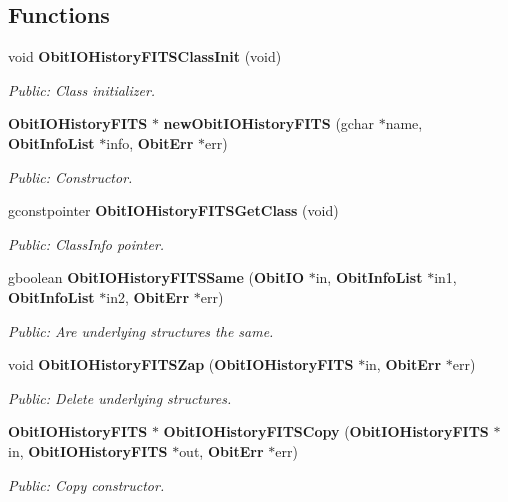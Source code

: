 \subsection*{Functions}
\begin{CompactItemize}
\item 
void {\bf Obit\-IOHistory\-FITSClass\-Init} (void)
\begin{CompactList}\small\item\em Public: Class initializer. \item\end{CompactList}\item 
{\bf Obit\-IOHistory\-FITS} $\ast$ {\bf new\-Obit\-IOHistory\-FITS} (gchar $\ast$name, {\bf Obit\-Info\-List} $\ast$info, {\bf Obit\-Err} $\ast$err)
\begin{CompactList}\small\item\em Public: Constructor. \item\end{CompactList}\item 
gconstpointer {\bf Obit\-IOHistory\-FITSGet\-Class} (void)
\begin{CompactList}\small\item\em Public: Class\-Info pointer. \item\end{CompactList}\item 
gboolean {\bf Obit\-IOHistory\-FITSSame} ({\bf Obit\-IO} $\ast$in, {\bf Obit\-Info\-List} $\ast$in1, {\bf Obit\-Info\-List} $\ast$in2, {\bf Obit\-Err} $\ast$err)
\begin{CompactList}\small\item\em Public: Are underlying structures the same. \item\end{CompactList}\item 
void {\bf Obit\-IOHistory\-FITSZap} ({\bf Obit\-IOHistory\-FITS} $\ast$in, {\bf Obit\-Err} $\ast$err)
\begin{CompactList}\small\item\em Public: Delete underlying structures. \item\end{CompactList}\item 
{\bf Obit\-IOHistory\-FITS} $\ast$ {\bf Obit\-IOHistory\-FITSCopy} ({\bf Obit\-IOHistory\-FITS} $\ast$in, {\bf Obit\-IOHistory\-FITS} $\ast$out, {\bf Obit\-Err} $\ast$err)
\begin{CompactList}\small\item\em Public: Copy constructor. \item\end{CompactList}\item 

\end{CompactItemize}

